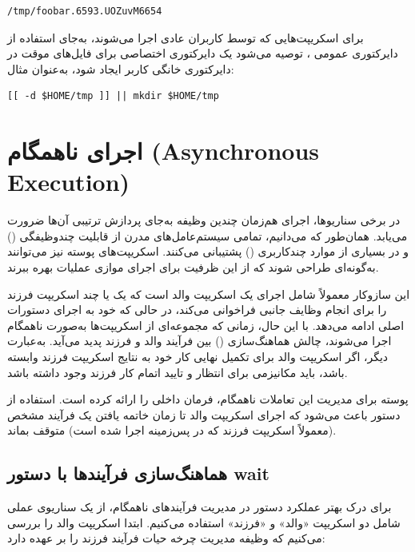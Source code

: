 \begin{latin}
\begin{lstlisting}
/tmp/foobar.6593.UOZuvM6654
\end{lstlisting}
\end{latin}

برای اسکریپت‌هایی که توسط کاربران عادی اجرا می‌شوند، به‌جای استفاده از دایرکتوری عمومی ، توصیه می‌شود یک دایرکتوری اختصاصی برای فایل‌های موقت در دایرکتوری خانگی کاربر ایجاد شود، به‌عنوان مثال:

\begin{latin}
\begin{lstlisting}
[[ -d $HOME/tmp ]] || mkdir $HOME/tmp
\end{lstlisting}
\end{latin}

\section{اجرای ناهمگام (Asynchronous Execution)}

در برخی سناریوها، اجرای هم‌زمان چندین وظیفه به‌جای پردازش ترتیبی آن‌ها ضرورت می‌یابد. همان‌طور که می‌دانیم، تمامی سیستم‌عامل‌های مدرن از قابلیت چندوظیفگی () و در بسیاری از موارد چندکاربری () پشتیبانی می‌کنند. اسکریپت‌های پوسته نیز می‌توانند به‌گونه‌ای طراحی شوند که از این ظرفیت برای اجرای موازی عملیات بهره ببرند.

این سازوکار معمولاً شامل اجرای یک اسکریپت والد است که یک یا چند اسکریپت فرزند را برای انجام وظایف جانبی فراخوانی می‌کند، در حالی که خود به اجرای دستورات اصلی ادامه می‌دهد. با این حال، زمانی که مجموعه‌ای از اسکریپت‌ها به‌صورت ناهمگام اجرا می‌شوند، چالش هماهنگ‌سازی () بین فرآیند والد و فرزند پدید می‌آید. به‌عبارت دیگر، اگر اسکریپت والد برای تکمیل نهایی کار خود به نتایج اسکریپت فرزند وابسته باشد، باید مکانیزمی برای انتظار و تایید اتمام کار فرزند وجود داشته باشد.

پوسته  برای مدیریت این تعاملات ناهمگام، فرمان داخلی  را ارائه کرده است. استفاده از دستور  باعث می‌شود که اجرای اسکریپت والد تا زمان خاتمه یافتن یک فرآیند مشخص (معمولاً اسکریپت فرزند که در پس‌زمینه اجرا شده است) متوقف بماند.

\subsection{هماهنگ‌سازی فرآیندها با دستور wait}

برای درک بهتر عملکرد دستور  در مدیریت فرآیندهای ناهمگام، از یک سناریوی عملی شامل دو اسکریپت «والد» و «فرزند» استفاده می‌کنیم. ابتدا اسکریپت والد را بررسی می‌کنیم که وظیفه مدیریت چرخه حیات فرآیند فرزند را بر عهده دارد:

